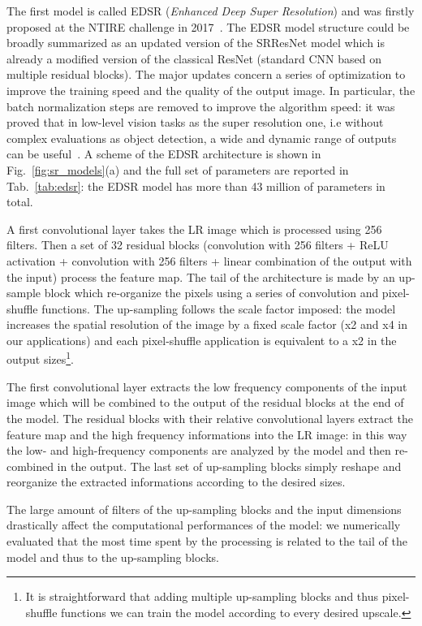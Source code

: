 \documentclass{standalone}
\begin{document}
The first model is called EDSR (\emph{Enhanced Deep Super Resolution}) and was firstly proposed at the NTIRE challenge in 2017~\cite{Agustsson_2017_CVPR_Workshops}.
The EDSR model structure could be broadly summarized as an updated version of the SRResNet model which is already a modified version of the classical ResNet (standard CNN based on multiple residual blocks).
The major updates concern a series of optimization to improve the training speed and the quality of the output image.
In particular, the batch normalization steps are removed to improve the algorithm speed: it was proved that in low-level vision tasks as the super resolution one, i.e without complex evaluations as object detection, a wide and dynamic range of outputs can be useful~\cite{edsr}.
A scheme of the EDSR architecture is shown in Fig.~\ref{fig:sr_models}(a) and the full set of parameters are reported in Tab.~\ref{tab:edsr}: the EDSR model has more than 43 million of parameters in total.

A first convolutional layer takes the LR image which is processed using 256 filters.
Then a set of 32 residual blocks (convolution with 256 filters + ReLU activation + convolution with 256 filters + linear combination of the output with the input) process the feature map.
The tail of the architecture is made by an up-sample block which re-organize the pixels using a series of convolution and pixel-shuffle functions.
The up-sampling follows the scale factor imposed: the model increases the spatial resolution of the image by a fixed scale factor (x2 and x4 in our applications) and each pixel-shuffle application is equivalent to a x2 in the output sizes\footnote{
  It is straightforward that adding multiple up-sampling blocks and thus pixel-shuffle functions we can train the model according to every desired upscale.
}.

The first convolutional layer extracts the low frequency components of the input image which will be combined to the output of the residual blocks at the end of the model.
The residual blocks with their relative convolutional layers extract the feature map and the high frequency informations into the LR image: in this way the low- and high-frequency components are  analyzed by the model and then re-combined in the output.
The last set of up-sampling blocks simply reshape and reorganize the extracted informations according to the desired sizes.

The large amount of filters of the up-sampling blocks and the input dimensions drastically affect the computational performances of the model: we numerically evaluated that the most time spent by the processing is related to the tail of the model and thus to the up-sampling blocks.
\end{document}
